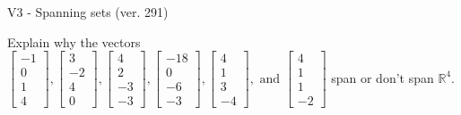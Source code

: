 \begin{exercise}
  \begin{exerciseTitle}V3 - Spanning sets (ver. 291)\end{exerciseTitle}
  \begin{exerciseStatement}
    Explain why the vectors \(\left[\begin{array}{r}
-1 \\
0 \\
1 \\
4
\end{array}\right] , \left[\begin{array}{r}
3 \\
-2 \\
4 \\
0
\end{array}\right] , \left[\begin{array}{r}
4 \\
2 \\
-3 \\
-3
\end{array}\right] , \left[\begin{array}{r}
-18 \\
0 \\
-6 \\
-3
\end{array}\right] , \left[\begin{array}{r}
4 \\
1 \\
3 \\
-4
\end{array}\right] , \text{ and } \left[\begin{array}{r}
4 \\
1 \\
1 \\
-2
\end{array}\right]\) span or don't span \(\mathbb{R}^4\). 
	



\end{exerciseStatement}
\end{exercise}
